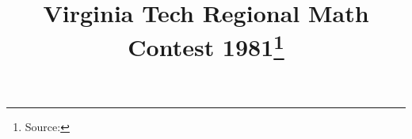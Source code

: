 \documentclass[10pt]{article}
\begin{document}
\title{Virginia Tech Regional Math Contest 1981\footnote{Source: \source}}
\author{\vspace{-2ex}}
\date{\vspace{-6ex}} %
\maketitle








\end{document}

